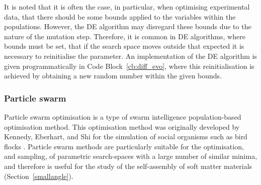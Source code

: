 It is noted that it is often the case, in particular, when optimising experimental data, that there should be some bounds applied to the variables within the populations.
However, the DE algorithm may disregard these bounds due to the nature of the mutation step.
Therefore, it is common in DE algorithms, where bounds must be set, that if the search space moves outside that expected it is necessary to reinitialise the parameter.
An implementation of the DE algorithm is given programmatically in Code Block~\ref{cb:diff_evo}, where this reinitialisation is achieved by obtaining a new random number within the given bounds.
%
\begin{figure}
        
\end{figure}
%
%
\begin{figure}
    \centering
        
\end{figure}
%
%
\begin{figure}
    \centering
        
\end{figure}
%
%
\begin{figure}
    \centering
        
\end{figure}
%

\subsubsection{Particle swarm}
\label{sec:partswarm}
Particle swarm optimisation is a type of swarm intelligence population-based optimisation method.
This optimisation method was originally developed by Kennedy, Eberhart, and Shi for the simulation of social organisms such as bird flocks \cite{kennedy_particle_1995,shi_modified_1998}.
Particle swarm methods are particularly suitable for the optimisation, and sampling, of parametric search-spaces with a large number of similar minima, and therefore is useful for the study of the self-assembly of soft matter materials (Section~\ref{smallangle}).

